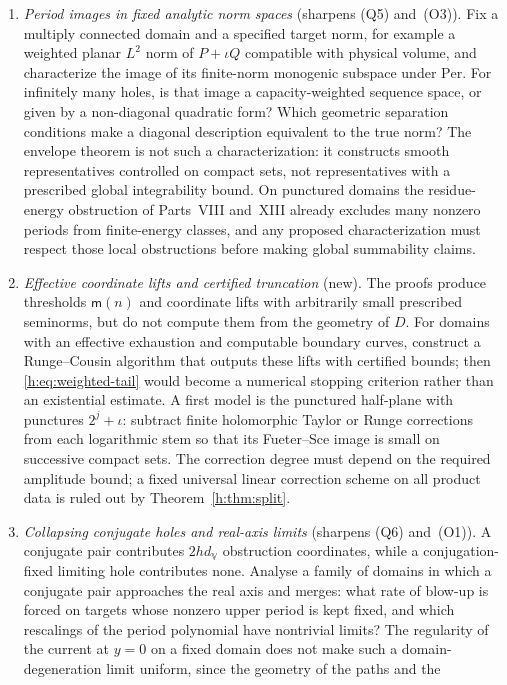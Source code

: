 \documentclass[11pt,a4paper]{article}
\numberwithin{equation}{section}
\theoremstyle{definition}
\theoremstyle{remark}
\theoremstyle{plain}
\newcommand{\Per}{\mathrm{Per}}
\newcommand{\VV}{\mathbb V}                       %
\newcommand{\dV}{d_{\VV}}                         %
\begin{document}
\begin{enumerate}[label=\textup{(R\arabic*)}]
\item \emph{Period images in fixed analytic norm spaces} (sharpens (Q5)
and~(O3)). Fix a multiply connected domain and a specified target norm, for
example a weighted planar $L^2$ norm of $P+\iota Q$ compatible with physical
volume, and characterize the image of its finite-norm monogenic subspace under
$\Per$. For infinitely many holes, is that image a capacity-weighted sequence
space, or given by a non-diagonal quadratic form? Which geometric separation
conditions make a diagonal description equivalent to the true norm? The
envelope theorem is not such a characterization: it constructs smooth
representatives controlled on compact sets, not representatives with a
prescribed global integrability bound. On punctured domains the residue-energy
obstruction of Parts~VIII and~XIII already excludes many nonzero periods from
finite-energy classes, and any proposed characterization must respect those
local obstructions before making global summability claims.
\item \emph{Effective coordinate lifts and certified truncation} (new). The
proofs produce thresholds $\mathsf m(n)$ and coordinate lifts with arbitrarily
small prescribed seminorms, but do not compute them from the geometry of $D$.
For domains with an effective exhaustion and computable boundary curves,
construct a Runge--Cousin algorithm that outputs these lifts with certified
bounds; then \eqref{h:eq:weighted-tail} would become a numerical stopping
criterion rather than an existential estimate. A first model is the punctured
half-plane with punctures $2^j+\iota$: subtract finite holomorphic Taylor or
Runge corrections from each logarithmic stem so that its Fueter--Sce image is
small on successive compact sets. The correction degree must depend on the
required amplitude bound; a fixed universal linear correction scheme on all
product data is ruled out by Theorem~\ref{h:thm:split}.
\item \emph{Collapsing conjugate holes and real-axis limits} (sharpens (Q6)
and~(O1)). A conjugate pair contributes $2h\dV$ obstruction coordinates, while a
conjugation-fixed limiting hole contributes none. Analyse a family of domains in
which a conjugate pair approaches the real axis and merges: what rate of
blow-up is forced on targets whose nonzero upper period is kept fixed, and
which rescalings of the period polynomial have nontrivial limits? The
regularity of the current at $y=0$ on a fixed domain does not make such a
domain-degeneration limit uniform, since the geometry of the paths and the

\end{enumerate}
\end{document}
